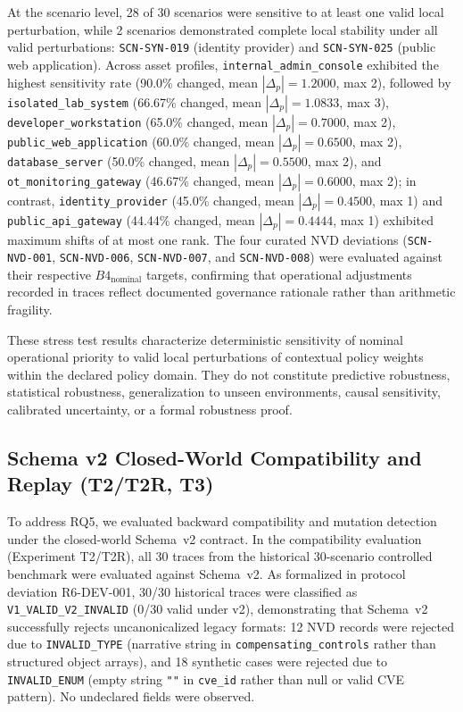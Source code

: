 \documentclass[conference]{IEEEtran}
\begin{document}
At the scenario level, 28 of 30 scenarios were sensitive to at least one valid local perturbation, while 2 scenarios demonstrated complete local stability under all valid perturbations: \texttt{SCN-SYN-019} (identity provider) and \texttt{SCN-SYN-025} (public web application). Across asset profiles, \texttt{internal\_admin\_console} exhibited the highest sensitivity rate (90.0\% changed, mean $|\Delta_p| = 1.2000$, max 2), followed by \texttt{isolated\_lab\_system} (66.67\% changed, mean $|\Delta_p| = 1.0833$, max 3), \texttt{developer\_workstation} (65.0\% changed, mean $|\Delta_p| = 0.7000$, max 2), \texttt{public\_web\_application} (60.0\% changed, mean $|\Delta_p| = 0.6500$, max 2), \texttt{database\_server} (50.0\% changed, mean $|\Delta_p| = 0.5500$, max 2), and \texttt{ot\_monitoring\_gateway} (46.67\% changed, mean $|\Delta_p| = 0.6000$, max 2); in contrast, \texttt{identity\_provider} (45.0\% changed, mean $|\Delta_p| = 0.4500$, max 1) and \texttt{public\_api\_gateway} (44.44\% changed, mean $|\Delta_p| = 0.4444$, max 1) exhibited maximum shifts of at most one rank. The four curated NVD deviations (\texttt{SCN-NVD-001}, \texttt{SCN-NVD-006}, \texttt{SCN-NVD-007}, and \texttt{SCN-NVD-008}) were evaluated against their respective $B4_{\text{nominal}}$ targets, confirming that operational adjustments recorded in traces reflect documented governance rationale rather than arithmetic fragility.

These stress test results characterize deterministic sensitivity of nominal operational priority to valid local perturbations of contextual policy weights within the declared policy domain. They do not constitute predictive robustness, statistical robustness, generalization to unseen environments, causal sensitivity, calibrated uncertainty, or a formal robustness proof.

\subsection{Schema v2 Closed-World Compatibility and Replay (T2/T2R, T3)}
\label{sec:r6_t2_t3}
To address RQ5, we evaluated backward compatibility and mutation detection under the closed-world Schema~v2 contract. In the compatibility evaluation (Experiment T2/T2R), all 30 traces from the historical 30-scenario controlled benchmark were evaluated against Schema~v2. As formalized in protocol deviation R6-DEV-001, 30/30 historical traces were classified as \texttt{V1\_VALID\_V2\_INVALID} (0/30 valid under v2), demonstrating that Schema~v2 successfully rejects uncanonicalized legacy formats: 12 NVD records were rejected due to \texttt{INVALID\_TYPE} (narrative string in \texttt{compensating\_controls} rather than structured object arrays), and 18 synthetic cases were rejected due to \texttt{INVALID\_ENUM} (empty string \texttt{""} in \texttt{cve\_id} rather than null or valid CVE pattern). No undeclared fields were observed.
\end{document}
